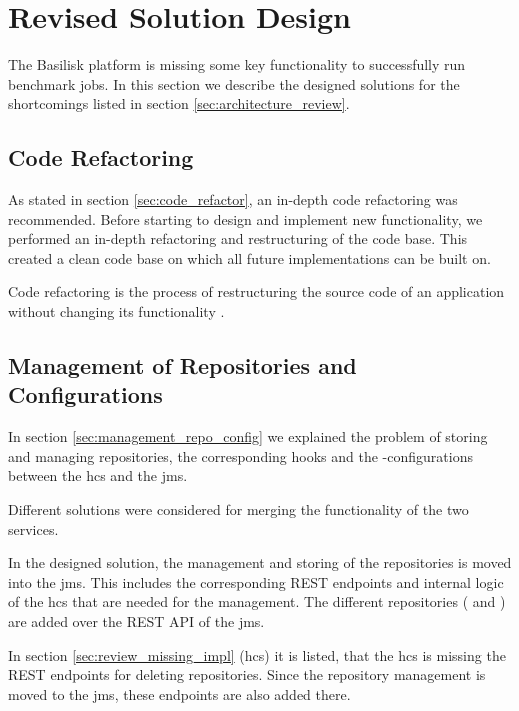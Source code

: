 \section{Revised Solution Design}
\label{sec:revised_solution_design}

The Basilisk platform is missing some key functionality to successfully run benchmark jobs.
In this section we describe the designed solutions for the shortcomings listed in section \ref{sec:architecture_review}.



\subsection{Code Refactoring}
\label{sec:impl_code_refactor}
As stated in section \ref{sec:code_refactor}, an in-depth code refactoring was recommended.
Before starting to design and implement new functionality, we performed an in-depth refactoring and restructuring of the code base.
This created a clean code base on which all future implementations can be built on.

Code refactoring is the process of restructuring the source code of an application without changing its functionality \cite{fowlerRefactoringImprovingDesign2019a}.


\subsection{Management of Repositories and Configurations}
\label{sec:management_repo_config_design}
In section \ref{sec:management_repo_config} we explained the problem of storing and managing repositories, the corresponding hooks and the \ts{}-configurations between the \acf{hcs} and the \acf{jms}.

Different solutions were considered for merging the functionality of the two services.

In the designed solution, the management and storing of the repositories is moved into the \ac{jms}.
This includes the corresponding REST endpoints and internal logic of the \ac{hcs} that are needed for the management.
The different repositories (\gh{} and \dockh{}) are added over the REST API of the \ac{jms}.

In section \ref{sec:review_missing_impl} (\acl{hcs}) it is listed, that the \ac{hcs} is missing the REST endpoints for deleting repositories.
Since the repository management is moved to the \ac{jms}, these endpoints are also added there.
\\

